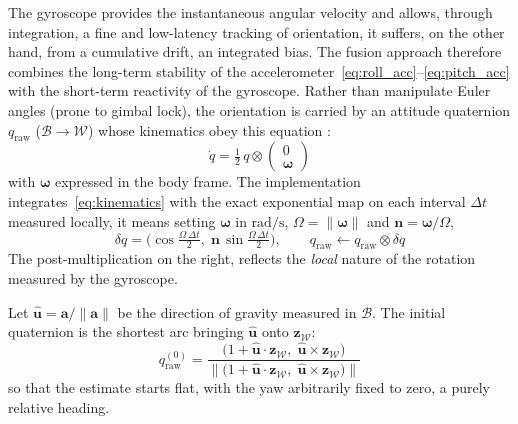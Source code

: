 \documentclass{tropLaClasse}
\begin{document}
The gyroscope provides the instantaneous angular velocity and allows, through integration, a fine and low-latency tracking of orientation, it suffers, on the other hand, from a cumulative drift, an integrated bias. The fusion approach therefore combines the long-term stability of the accelerometer~\eqref{eq:roll_acc}--\eqref{eq:pitch_acc} with the short-term reactivity of the gyroscope. Rather than manipulate Euler angles (prone to gimbal lock), the orientation is carried by an attitude quaternion $q_{\text{raw}}$ ($\mathcal B\rightarrow\mathcal W$) whose kinematics obey this equation :
\begin{equation}
\dot{q}=\tfrac{1}{2}\,q\otimes
\begin{pmatrix}0\\ \boldsymbol{\omega}\end{pmatrix}
\label{eq:kinematics}
\end{equation}
with $\boldsymbol{\omega}$ expressed in the body frame. The implementation integrates~\eqref{eq:kinematics} with the exact exponential map on each interval $\Delta t$ measured locally, it means setting $\boldsymbol{\omega}$ in $\mathrm{rad/s}$, $\Omega=\lVert\boldsymbol{\omega}\rVert$ and $\mathbf{n}=\boldsymbol{\omega}/\Omega$,
\begin{equation}
\delta q=\Big(\cos\tfrac{\Omega\,\Delta t}{2},\;\mathbf{n}\,\sin\tfrac{\Omega\,\Delta t}{2}\Big),
\qquad
q_{\text{raw}}\leftarrow q_{\text{raw}}\otimes\delta q
\label{eq:gyro_step}
\end{equation}
The post-multiplication on the right, reflects the \emph{local} nature of the rotation measured by the gyroscope.

Let $\hat{\mathbf{u}}=\mathbf{a}/\lVert\mathbf{a}\rVert$ be the direction of gravity measured in $\mathcal B$. The initial quaternion is the shortest arc bringing $\hat{\mathbf{u}}$ onto $\mathbf{z}_{\mathcal W}$:
\begin{equation}
q_{\text{raw}}^{(0)}=\frac{\big(1+\hat{\mathbf{u}}\cdot\mathbf{z}_{\mathcal W},\;\hat{\mathbf{u}}\times\mathbf{z}_{\mathcal W}\big)}{\big\lVert\big(1+\hat{\mathbf{u}}\cdot\mathbf{z}_{\mathcal W},\;\hat{\mathbf{u}}\times\mathbf{z}_{\mathcal W}\big)\big\rVert}
\label{eq:seed}
\end{equation}
so that the estimate starts flat, with the yaw arbitrarily fixed to zero, a purely relative heading.
\end{document}
